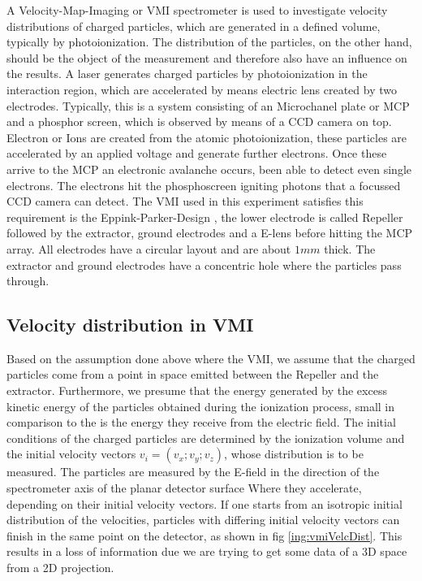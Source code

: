 A Velocity-Map-Imaging or VMI spectrometer is used to investigate velocity distributions of charged particles, which are generated in a defined volume, typically by photoionization. The distribution of the particles, on the other hand, should be the object of the measurement and therefore also have an influence on the results. 
A laser generates charged particles by photoionization in the interaction region, which are accelerated by means electric lens created by two electrodes. Typically, this is a system consisting of an Microchanel plate or MCP  and a phosphor screen, which is observed by means of a CCD camera on top. Electron or Ions are created from the atomic photoionization, these particles are accelerated by an applied voltage and generate further electrons. Once these arrive to the MCP an electronic avalanche occurs, been able to detect even single electrons. The electrons hit the phosphoscreen igniting photons that a focussed CCD camera can detect.
The VMI used in this experiment satisfies this requirement is the Eppink-Parker-Design \cite{eppink_velocity_1997}, the lower  electrode is called Repeller followed by the extractor, ground electrodes and a E-lens before hitting the MCP array.  All electrodes have a circular layout and are about $1 mm$ thick.  The extractor and ground electrodes have a concentric hole where the particles pass through.
 

\subsection{Velocity distribution in VMI}

Based on the assumption done above where the VMI, we assume that the charged particles come from a point in space emitted between the Repeller and the extractor. Furthermore, we presume that the energy generated by the excess kinetic energy of the particles obtained during the ionization process, small in comparison to the is the energy they receive from the electric field.
The initial conditions of the charged particles are determined by the ionization volume and the initial velocity vectors $v_{i} = (v_{x}; v_{y}; v_{z})$, whose distribution is to be measured. The particles are measured by the E-field in the direction of the spectrometer axis of the planar detector surface
Where they accelerate, depending on their initial velocity vectors. If one starts from an isotropic initial distribution of the velocities, particles with differing initial velocity vectors can finish in the same point on the detector, as shown in fig \ref{ing:vmiVelcDist}. This results in a loss of information due we are trying to get some data of a 3D space from a 2D projection.

